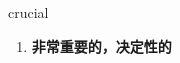 
\begin{frame}
{\huge crucial}
\begin{center}
\begin{enumerate}\Large
  \item \textbf{非常重要的，决定性的}
\end{enumerate}
\end{center}
\end{frame}
